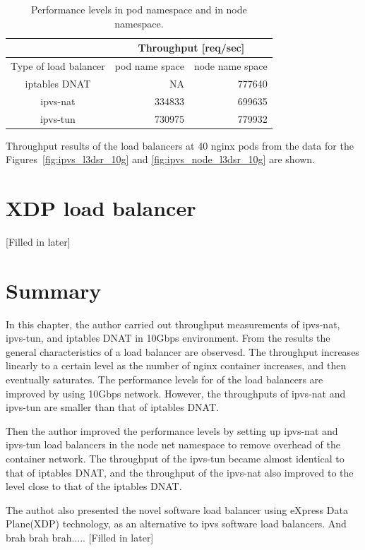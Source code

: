 \begin{table}[h]
  \centering
  \begin{tabular}{|l|r|r|}
    \hline
    & \multicolumn{2}{c|}{Throughput {[}req/sec{]}} \\ \hline
    Type of load balancer & \multicolumn{1}{c|}{pod name space} & \multicolumn{1}{c|}{node name space} \\ \hline
    \multicolumn{1}{|c|}{iptables DNAT} & NA & \cellcolor[HTML]{ECF4FF}777640 \\ \hline
    \multicolumn{1}{|c|}{ipvs-nat} & \cellcolor[HTML]{ECF4FF}334833 & \cellcolor[HTML]{FFF3F3}699635 \\ \hline
    \multicolumn{1}{|c|}{ipvs-tun} & \cellcolor[HTML]{ECF4FF}730975 & \cellcolor[HTML]{FFF3F3}779932 \\ \hline
  \end{tabular}
  \caption{Performance levels in pod namespace and in node namespace.}
  \raggedright
  Throughput results of the load balancers at 40 nginx pods from the data for the Figures~\ref{fig:ipvs_l3dsr_10g} and \ref{fig:ipvs_node_l3dsr_10g} are shown.
  \label{table:nat_tun_dnat_pod_node}
\end{table}

\FloatBarrier
\section{XDP load balancer}
[Filled in later]

\section{Summary}

In this chapter, the author carried out throughput measurements of ipvs-nat, ipvs-tun, and iptables DNAT in 10Gbps environment.
From the results the general characteristics of a load balancer are observesd.
The throughput increases linearly to a certain level as the number of nginx container increases, and then eventually saturates.
The performance levels for of the load balancers are improved by using 10Gbps network.
However, the throughputs of ipvs-nat and ipvs-tun are smaller than that of iptables DNAT.

Then the author improved the performance levels by setting up ipvs-nat and ipvs-tun load balancers in the node net namespace to remove overhead of the container network.
The throughput of the ipvs-tun became almost identical to that of iptables DNAT, and the throughput of the ipvs-nat also improved to the level close to that of the iptables DNAT.

The authot also presented the novel software load balancer using eXpress Data Plane(XDP) technology, as an alternative to ipvs software load balancers.
And brah brah brah.....
[Filled in later]




